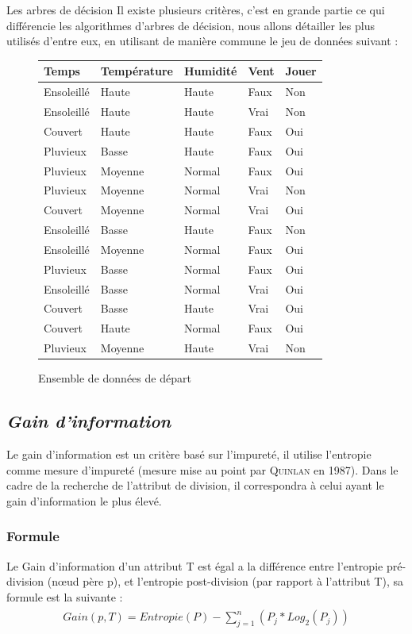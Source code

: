 \documentclass[a4paper, 11pt]{report}
\begin{document}
\begin{chapter}{Les arbres de décision}
Il existe plusieurs critères, c'est en grande partie ce qui différencie les algorithmes d'arbres de décision, nous allons détailler les plus utilisés d'entre eux, en utilisant de manière commune le jeu de données suivant :
\begin{figure}[!h]
\begin{center}

\begin{tabular}{| l | l | l | l | l |}
\hline
\rowcolor{gray!25}
Temps & Température & Humidité & Vent & Jouer \\
\hline
Ensoleillé & Haute & Haute & Faux & Non \\
\hline
Ensoleillé & Haute & Haute & Vrai & Non \\
\hline
Couvert & Haute & Haute & Faux & Oui \\
\hline
Pluvieux & Basse & Haute & Faux & Oui \\
\hline
Pluvieux & Moyenne & Normal & Faux & Oui \\
\hline
Pluvieux & Moyenne & Normal & Vrai & Non \\
\hline
Couvert & Moyenne & Normal & Vrai & Oui \\
\hline
Ensoleillé & Basse & Haute & Faux & Non \\
\hline
Ensoleillé & Moyenne & Normal & Faux & Oui \\
\hline
Pluvieux & Basse & Normal & Faux & Oui \\
\hline
Ensoleillé & Basse & Normal & Vrai & Oui \\
\hline
Couvert & Basse & Haute & Vrai & Oui \\
\hline
Couvert & Haute & Normal & Faux & Oui \\
\hline
Pluvieux & Moyenne & Haute & Vrai & Non \\
\hline
\end{tabular}
\caption{Ensemble de données de départ}
\end{center}
\end{figure}
\subsection*{\emph{Gain d'information}}
Le gain d'information est un critère basé sur l'impureté, il utilise l'entropie comme mesure d'impureté (mesure mise au point par \textsc{Quinlan} en 1987)\cite{singh2014comparative}. Dans le cadre de la recherche de l'attribut de division, il correspondra à celui ayant le gain d'information le plus élevé. 

\subsubsection*{Formule}
Le Gain d'information d'un attribut T est égal a la différence entre l'entropie pré-division (nœud père p), et l'entropie post-division (par rapport à l'attribut T), sa formule est la suivante :
\begin{align}
\begin{split}\label{formule:gain}
Gain(p,T) = Entropie(P) - \sum_{j=1}^n (P_j * Log_2(P_j))
\end{split}
\end{align}

\end{chapter}
\end{document}

